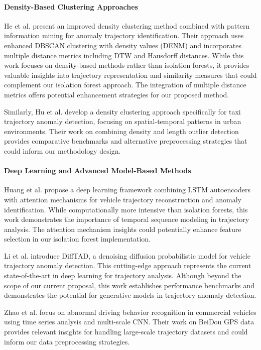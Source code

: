 \documentclass[runningheads]{llncs}
\begin{document}
\paragraph{Density-Based Clustering Approaches}
He et al. present an improved density clustering method combined with pattern information mining for anomaly trajectory identification. Their approach uses enhanced DBSCAN clustering with density values (DENM) and incorporates multiple distance metrics including DTW and Hausdorff distances. While this work focuses on density-based methods rather than isolation forests, it provides valuable insights into trajectory representation and similarity measures that could complement our isolation forest approach. The integration of multiple distance metrics offers potential enhancement strategies for our proposed method.

Similarly, Hu et al. develop a density clustering approach specifically for taxi trajectory anomaly detection, focusing on spatial-temporal patterns in urban environments. Their work on combining density and length outlier detection provides comparative benchmarks and alternative preprocessing strategies that could inform our methodology design.

\paragraph{Deep Learning and Advanced Model-Based Methods}
Huang et al. propose a deep learning framework combining LSTM autoencoders with attention mechanisms for vehicle trajectory reconstruction and anomaly identification. While computationally more intensive than isolation forests, this work demonstrates the importance of temporal sequence modeling in trajectory analysis. The attention mechanism insights could potentially enhance feature selection in our isolation forest implementation.

Li et al. introduce DiffTAD, a denoising diffusion probabilistic model for vehicle trajectory anomaly detection. This cutting-edge approach represents the current state-of-the-art in deep learning for trajectory analysis. Although beyond the scope of our current proposal, this work establishes performance benchmarks and demonstrates the potential for generative models in trajectory anomaly detection.

Zhao et al. focus on abnormal driving behavior recognition in commercial vehicles using time series analysis and multi-scale CNN. Their work on BeiDou GPS data provides relevant insights for handling large-scale trajectory datasets and could inform our data preprocessing strategies.
\end{document}
